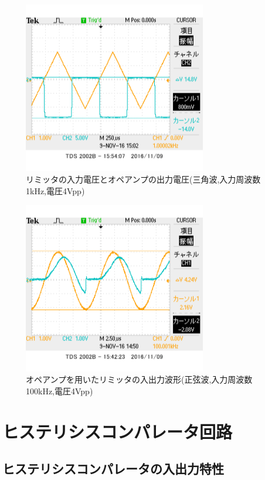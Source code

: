 \documentclass[11pt,a4j]{jsarticle}
\begin{document}
 \begin{figure}[htbp]
  \centering
  \includegraphics[width=8cm,clip]{1_1_ampFG_f1V4sankaku_ViVa.png}
  \caption{リミッタの入力電圧とオペアンプの出力電圧(三角波,入力周波数1kHz,電圧4Vpp)}
  \label{fig:ampFGf1v4viva}
 \end{figure}%
 
 \begin{figure}[htbp]
  \centering
  \includegraphics[width=8cm,clip]{1_1_ampFG_f100V4_ViVo.png}
  \caption{オペアンプを用いたリミッタの入出力波形(正弦波,入力周波数100kHz,電圧4Vpp)}
  \label{fig:ampFGf100v4}
 \end{figure}%
  
  
  \clearpage
    
 \section{ヒステリシスコンパレータ回路}
  \subsection{ヒステリシスコンパレータの入出力特性}
\end{document}
